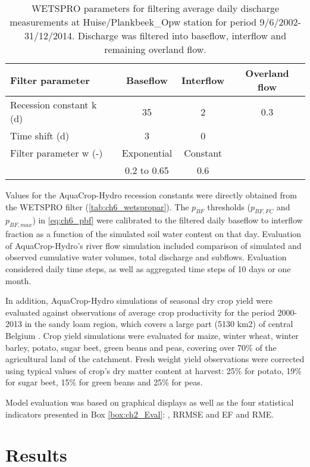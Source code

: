 \begin{table}[htbp]
  	\caption{WETSPRO parameters for filtering average daily discharge measurements at Huise/Plankbeek\_Opw station for period 9/6/2002-31/12/2014. Discharge was filtered into baseflow, interflow and remaining overland flow.}
\begin{tabular}{lccc}
\toprule
\textbf{Filter parameter} & \textbf{Baseflow} & \textbf{Interflow} & \textbf{Overland flow} \\
\midrule
Recession constant k (d) & 35    & 2     & 0.3 \\
Time shift (d) & 3     & 0     &  \\
Filter parameter w (-) & Exponential & Constant &  \\
      & 0.2 to 0.65 & 0.6   &  \\
\bottomrule
\end{tabular}%
  \label{tab:ch6_wetspropar}%
  \end{table}

Values for the AquaCrop-Hydro recession constants were directly obtained from the WETSPRO filter (\autoref{tab:ch6_wetspropar}). The $p_{BF}$ thresholds ($p_{BF,FC}$ and $p_{BF,max}$) in \autoref{eq:ch6_pbf} were calibrated to the filtered daily baseflow to interflow fraction as a function of the simulated soil water content on that day. Evaluation of AquaCrop-Hydro’s river flow simulation included comparison of simulated and observed cumulative water volumes, total discharge and subflows. Evaluation considered daily time steps, as well as aggregated time steps of 10 days or one month. 

In addition, AquaCrop-Hydro simulations of seasonal dry crop yield were evaluated against observations of average crop productivity for the period 2000-2013 in the sandy loam region, which covers a large part (5130 km2) of central Belgium \parencite{fodeconomie2014}. Crop yield simulations were evaluated for maize, winter wheat, winter barley, potato, sugar beet, green beans and peas, covering over 70\% of the agricultural land of the catchment. Fresh weight yield observations were corrected using typical values of crop's dry matter content at harvest: 25\% for potato, 19\% for sugar beet, 15\% for green beans and 25\% for peas.

Model evaluation was based on graphical displays as well as the four statistical indicators presented in Box \ref{box:ch2_Eval}: \Rsq, RRMSE and EF and RME. 

\section{Results}
